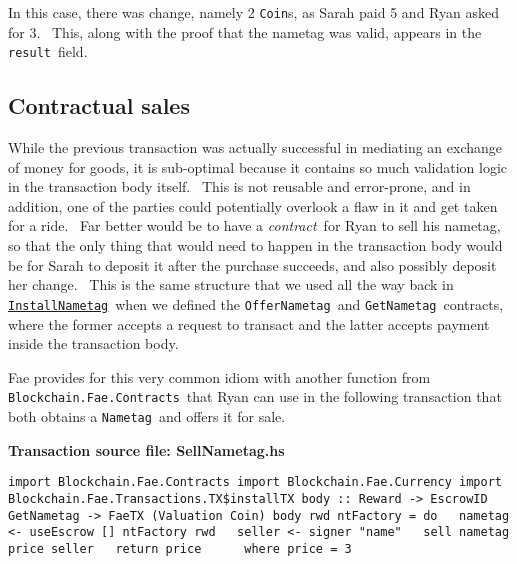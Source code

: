 \documentclass[11pt]{article}
\newcommand{\codeblock}[1]{\begin{mdframed}[
    backgroundcolor=header-color,
    linecolor=header-color,
    innertopmargin=10pt,
    ]{\texttt{#1}}\end{mdframed}}
\DeclareRobustCommand{\fuline}[1]{\texorpdfstring{\uline{#1}}{#1}}
\begin{document}
In this case, there was change, namely 2 \texttt{Coin}s, as Sarah paid 5 and Ryan asked for 3.  This, along with the proof that the nametag was valid, appears in the \texttt{result} field.

\subsection{Contractual sales}
\vspace{5.5pt}

While the previous transaction was actually successful in mediating an exchange of money for goods, it is sub-optimal because it contains so much validation logic in the transaction body itself.  This is not reusable and error-prone, and in addition, one of the parties could potentially overlook a flaw in it and get taken for a ride.  Far better would be to have a \textit{contract} for Ryan to sell his nametag, so that the only thing that would need to happen in the transaction body would be for Sarah to deposit it after the purchase succeeds, and also possibly deposit her change.  This is the same structure that we used all the way back in \texttt{\href{https://consensys.quip.com/9kkhA5IlabyD/Tutorial-3-Selling-buying-and-trading\%23CWNACAY8Tse}{\fuline{InstallNametag}}} when we defined the \texttt{OfferNametag} and \texttt{GetNametag} contracts, where the former accepts a request to transact and the latter accepts payment inside the transaction body.


\vspace{11pt}

Fae provides for this very common idiom with another function from \texttt{Blockchain.Fae.Contracts} that Ryan can use in the following transaction that both obtains a \texttt{Nametag} and offers it for sale.


\vspace{11pt}

\textbf{Transaction source file: SellNametag.hs}

\codeblock{import Blockchain.Fae.Contracts\newline
import Blockchain.Fae.Currency\newline
import Blockchain.Fae.Transactions.TX\$installTX\newline
\newline
body :: Reward -\textgreater{} EscrowID GetNametag -\textgreater{} FaeTX (Valuation Coin)\newline
body rwd ntFactory = do\newline
  nametag \textless{}- useEscrow {[}{]} ntFactory rwd\newline
  seller \textless{}- signer "name"\newline
  sell nametag price seller\newline
  return price\newline
  \newline
  where price = 3}
\end{document}
